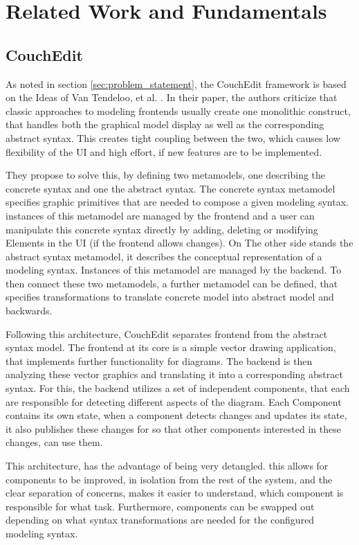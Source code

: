 \chapter{Related Work and Fundamentals}


\section{CouchEdit}
As noted in section \ref{sec:problem_statement}, the CouchEdit framework is based on the Ideas of Van Tendeloo, et al. \cite{van_tendeloo_concrete_2017}. In their paper, the authors criticize that classic approaches to modeling frontends usually create one monolithic construct, that handles both the graphical model display as well as the corresponding abstract syntax. This creates tight coupling between the two, which causes low flexibility of the UI and high effort, if new features are to be implemented. 

They propose to solve this, by defining two metamodels, one describing the concrete syntax and one the abstract syntax. The concrete syntax metamodel specifies graphic primitives that are needed to compose a given modeling syntax. instances of this metamodel are managed by the frontend and a user can manipulate this concrete syntax directly by adding, deleting or modifying Elements in the UI (if the frontend allows changes). On The other side stands the abstract syntax metamodel, it describes the conceptual representation of a modeling syntax. Instances of this metamodel are managed by the backend. To then connect these two metamodels, a further metamodel can be defined, that specifies transformations to translate concrete model into abstract model and backwards. 

Following this architecture, CouchEdit separates frontend from the abstract syntax model. The frontend at its core is a simple vector drawing application, that implements further functionality for diagrams. The backend is then analyzing these vector graphics and translating it into a corresponding abstract syntax. For this, the backend utilizes a set of independent components, that each are responsible for detecting different aspects of the diagram. Each Component contains its own state, when a component detects changes and updates its state, it also publishes these changes for so that other components interested in these changes, can use them.  

This architecture, has the advantage of being very detangled. this allows for components to be improved, in isolation from the rest of the system, and the clear separation of concerns, makes it easier to understand, which component is responsible for what task. Furthermore, components can be swapped out depending on what syntax transformations are needed for the configured modeling syntax.


